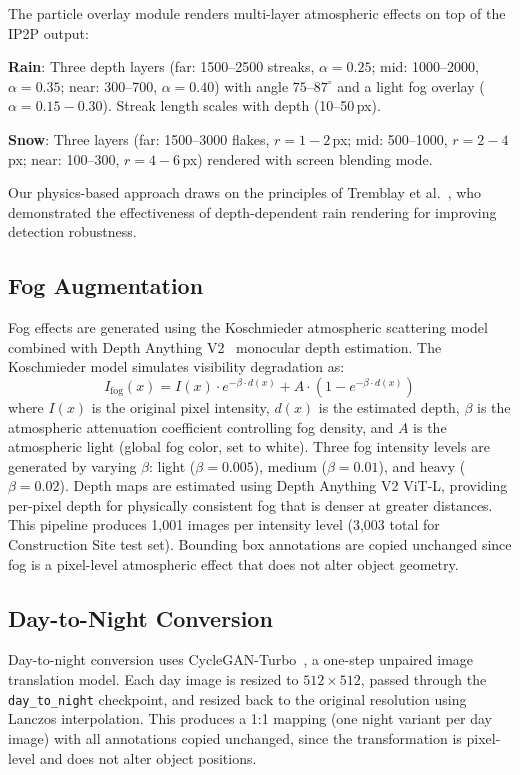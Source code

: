 \documentclass[12pt]{article}
\begin{document}
The particle overlay module renders multi-layer atmospheric effects on top of the IP2P output:

\textbf{Rain}: Three depth layers (far: 1500--2500 streaks, $\alpha=0.25$; mid: 1000--2000, $\alpha=0.35$; near: 300--700, $\alpha=0.40$) with angle $75$--$87^{\circ}$ and a light fog overlay ($\alpha=0.15{-}0.30$). Streak length scales with depth (10--50\,px).

\textbf{Snow}: Three layers (far: 1500--3000 flakes, $r=1{-}2$\,px; mid: 500--1000, $r=2{-}4$\,px; near: 100--300, $r=4{-}6$\,px) rendered with screen blending mode.

Our physics-based approach draws on the principles of Tremblay et al.~\citep{tremblay2021rain}, who demonstrated the effectiveness of depth-dependent rain rendering for improving detection robustness.

\subsection{Fog Augmentation}

Fog effects are generated using the Koschmieder atmospheric scattering model combined with Depth Anything V2~\citep{yang2024depthanything} monocular depth estimation. The Koschmieder model simulates visibility degradation as:
\begin{equation}
    I_{\text{fog}}(x) = I(x) \cdot e^{-\beta \cdot d(x)} + A \cdot (1 - e^{-\beta \cdot d(x)})
\end{equation}
where $I(x)$ is the original pixel intensity, $d(x)$ is the estimated depth, $\beta$ is the atmospheric attenuation coefficient controlling fog density, and $A$ is the atmospheric light (global fog color, set to white). Three fog intensity levels are generated by varying $\beta$: light ($\beta{=}0.005$), medium ($\beta{=}0.01$), and heavy ($\beta{=}0.02$). Depth maps are estimated using Depth Anything V2 ViT-L, providing per-pixel depth for physically consistent fog that is denser at greater distances. This pipeline produces 1,001 images per intensity level (3,003 total for Construction Site test set). Bounding box annotations are copied unchanged since fog is a pixel-level atmospheric effect that does not alter object geometry.

\subsection{Day-to-Night Conversion}

Day-to-night conversion uses CycleGAN-Turbo~\citep{parmar2024img2img}, a one-step unpaired image translation model. Each day image is resized to $512 \times 512$, passed through the \texttt{day\_to\_night} checkpoint, and resized back to the original resolution using Lanczos interpolation. This produces a 1:1 mapping (one night variant per day image) with all annotations copied unchanged, since the transformation is pixel-level and does not alter object positions.
\end{document}
